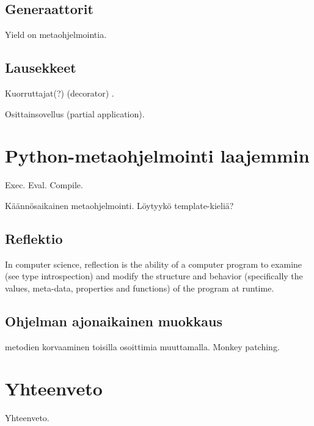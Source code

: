 \documentclass[finnish]{tktltiki2}
\theoremstyle{definition}
\theoremstyle{remark}
\begin{document}
\subsection{Generaattorit}


Yield on metaohjelmointia.

\subsection{Lausekkeet}

Kuorruttajat(?) (decorator) \cite{dubois2005nest}.

Osittainsovellus (partial application).



\section{Python-metaohjelmointi laajemmin}


Exec. Eval. Compile.

Käännösaikainen metaohjelmointi. Löytyykö template-kieliä?


\subsection{Reflektio}

In computer science, reflection is the ability of a computer program to examine (see type introspection) and modify the structure and behavior (specifically the values, meta-data, properties and functions) of the program at runtime.




\subsection{Ohjelman ajonaikainen muokkaus}

metodien korvaaminen toisilla osoittimia muuttamalla. Monkey patching.

\section{Yhteenveto}

Yhteenveto.


\pagebreak

%
%
% 
%




\lastpage
\end{document}
